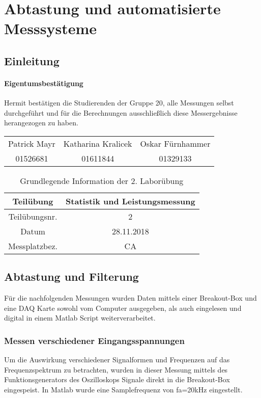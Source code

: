 \chapter{Abtastung und automatisierte Messsysteme}
\section{Einleitung}
\subsubsection{Eigentumsbestätigung}
Hermit bestätigen die Studierenden der Gruppe 20, alle Messungen selbst durchgeführt und für die Berechnungen ausschließlich diese Messergebnisse herangezogen zu haben. \\
\begin{tabular*}{\textwidth}{c|c|c}
	Patrick Mayr & Katharina Kralicek & Oskar Fürnhammer \\ 
	01526681 & 01611844 & 01329133 \\ 
\end{tabular*}

\begin{table}[]
	\centering
	\begin{tabular}{|c|c|}
		\hline 
		Teilübung 	& Statistik und Leistungsmessung \\
		\hline 
		Teilübungsnr. 		& 2	 \\ 
		\hline 
		Datum 		& 28.11.2018 \\ 
		\hline 
		Messplatzbez. 	& CA \\
		\hline
	\end{tabular} 
	\caption{Grundlegende Information der 2. Laborübung}
\end{table}



\section{Abtastung und Filterung}
Für die nachfolgenden Messungen wurden Daten mittels einer Breakout-Box und eine DAQ Karte sowohl vom Computer ausgegeben, als auch eingelesen und digital in einem Matlab Script weiterverarbeitet.
\subsection{Messen verschiedener Eingangsspannungen}
Um die Auswirkung verschiedener Signalformen und Frequenzen auf das Frequenzspektrum zu betrachten, wurden in dieser Messung mittels des Funktionsgenerators des Oszilloskops Signale direkt in die Breakout-Box eingespeist. In Matlab wurde eine Samplefrequenz von fa=20kHz eingestellt.

